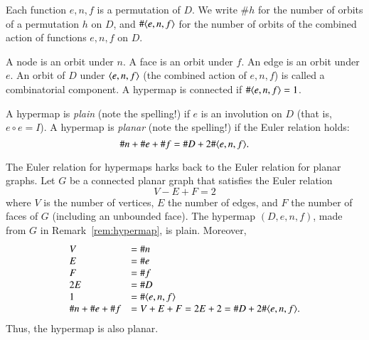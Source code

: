 Each function $e,n,f$ is a permutation of $D$.  
We write $\#h$ for the
number of orbits of a permutation $h$ on $D$, and $\#\langle e,n,f\rangle$
for the number of orbits of the combined action of functions $e,n,f$
on $D$.   

\begin{definition}  A node is an orbit  under
$n$.  A face is an  orbit  under $f$.  An edge
is an orbit under $e$. An orbit of $D$ under $\langle e,n,f\rangle$
(the combined action of $e,n,f$) is called a combinatorial component.
A hypermap is connected
if 
  $\#\langle e,n,f\rangle = 1$. 
\end{definition}

\begin{definition} A hypermap is {\it plain} (note the spelling!) if
$e$ is an involution on $D$ (that is, $e\circ e = I$).  A hypermap
is {\it planar} (note the spelling!) if the Euler relation holds:
    $$\# n + \# e + \# f = \# D + 2 \#\langle e,n,f\rangle.$$
\end{definition}


\begin{remark}  The Euler relation for hypermaps harks back
to the Euler relation for planar graphs.
Let $G$ be a connected planar graph that satisfies the
Euler relation
    $$V - E + F = 2$$
where $V$ is the number of vertices, $E$ the number of edges, and
$F$ the number of faces of $G$ (including an unbounded face). The
hypermap $(D,e,n,f)$, made from $G$ in
Remark~\ref{rem:hypermap}, is plain.
Moreover,
    $$\begin{array}{lll}
    V &= \# n\\
    E &= \# e\\
    F &= \# f\\
    2E &= \# D\\
    1 &= \#\langle e,n,f\rangle\\
    \# n + \#e + \# f &= 
    V + E + F = 2 E + 2 = \# D + 2 \#\langle e,n,f\rangle.
    \end{array}
    $$
Thus, the hypermap is also planar. 
\end{remark}


%
%

